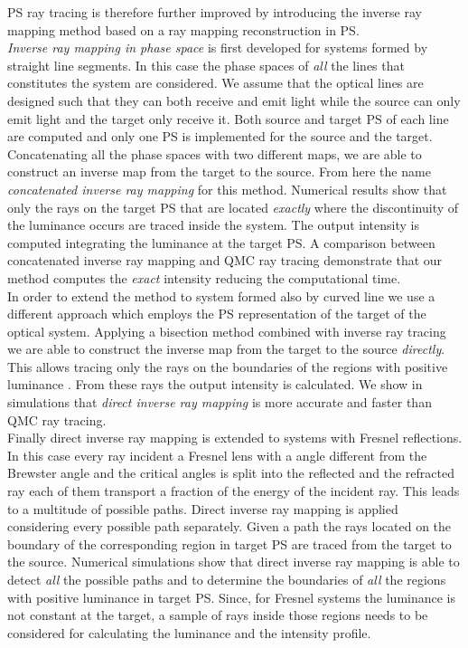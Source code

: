 PS ray tracing is therefore further improved by introducing the inverse ray mapping method based on a ray mapping reconstruction in PS. 
\\ \indent
\textit{Inverse ray mapping in phase space} is first developed for systems formed by straight line segments. In this case the phase spaces of \textit{all} the lines that constitutes the system are considered. We assume that the optical lines are designed such that they can both receive and emit light while the source can only emit light and the target only receive it. Both source and target PS of each line are computed and only one PS is implemented for the source and the target. Concatenating all the phase spaces with two different maps, we are able to construct an inverse map from the target to the source. From here the name \textit{concatenated inverse ray mapping} for this method. Numerical results show that only the rays on the target PS that are located \textit{exactly} where the discontinuity of the luminance occurs are traced inside the system. The output intensity is computed integrating the luminance at the target PS. A comparison between concatenated inverse ray mapping and QMC ray tracing demonstrate that our method computes the \textit{exact} intensity reducing the computational time. \\ \indent In order to extend the method to system formed also by curved line we use a different approach which employs the PS representation of the target of the optical system. Applying a bisection method combined with inverse ray tracing we are able to construct the inverse map from the target to the source \textit{directly}. This allows tracing only the rays on the boundaries of the regions with positive luminance \cite{filosa2017inverse}. From these rays the output intensity is calculated. We show in simulations that \textit{direct inverse ray mapping} is more accurate and faster than QMC ray tracing. \\ \indent Finally direct inverse ray mapping is extended to systems with Fresnel reflections. In this case every ray incident a Fresnel lens with a angle different from the Brewster angle and the critical angles is split into the reflected and the refracted ray each of them transport a fraction of the energy of the incident ray. This leads to a multitude of possible paths. Direct inverse ray mapping is applied considering every possible path separately. Given a path the rays located on the boundary of the corresponding region in target PS are traced from the target to the source. Numerical simulations show that direct inverse ray mapping is able to detect \textit{all} the possible paths and to determine the boundaries of \textit{all} the regions with positive luminance in target PS. Since, for Fresnel systems the luminance is not constant at the target, a sample of rays inside those regions needs to be considered for calculating the luminance and the intensity profile.
